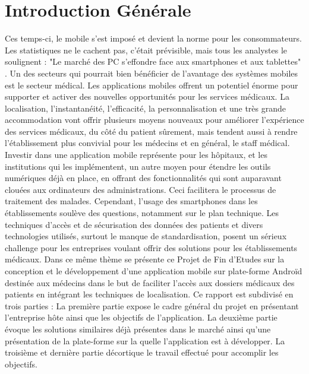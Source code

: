 
\chapter{Introduction Générale}

Ces temps-ci, le mobile s’est imposé et devient la norme pour les consommateurs. Les statistiques ne le cachent pas, c’était prévisible, mais tous les analystes le soulignent : "Le marché des PC s’effondre face aux smartphones et aux tablettes" \cite{venturebeat.com}. Un des secteurs qui pourrait bien bénéficier de l’avantage des systèmes mobiles est le secteur médical.
Les applications mobiles offrent un potentiel énorme pour supporter et activer des nouvelles opportunités pour les services médicaux. La localisation, l’instantanéité, l’efficacité, la personnalisation et une très grande accommodation vont offrir plusieurs moyens nouveaux pour améliorer l’expérience des services médicaux, du côté du patient sûrement, mais tendent aussi à rendre l’établissement plus convivial pour les médecins et en général, le staff médical.
Investir dans une application mobile représente pour les hôpitaux, et les institutions qui les implémentent, un autre moyen pour étendre les outils numériques déjà en place, en offrant des fonctionnalités qui sont auparavant clouées  aux ordinateurs des administrations. Ceci facilitera le processus de traitement des malades.
Cependant, l’usage des smartphones dans les établissements soulève des  questions, notamment sur le plan technique. Les techniques d’accès et de sécurisation des données des patients et divers technologies utilisés, surtout le manque de standardisation, posent un sérieux challenge pour les entreprises voulant offrir des solutions pour les établissements médicaux.
Dans ce même thème se présente ce Projet de Fin d’Etudes sur la conception et le développement d’une application mobile sur plate-forme Androïd destinée aux médecins dans le but de faciliter l’accès aux dossiers médicaux des patients en intégrant les techniques de localisation. Ce rapport est subdivisé en trois parties : La première partie expose le cadre général du projet en présentant l’entreprise hôte ainsi que les objectifs de l’application. La deuxième partie évoque les solutions similaires déjà présentes dans le marché ainsi qu’une présentation de la plate-forme sur la quelle l’application est à développer. La troisième et dernière partie décortique le travail effectué pour accomplir les objectifs.
